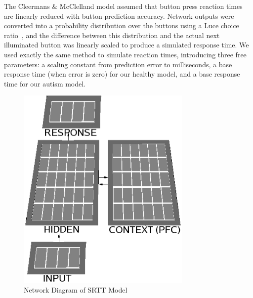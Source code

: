 The Cleermans \& McClelland model assumed that button press reaction times are linearly reduced with button prediction accuracy. Network outputs were converted into a probability distribution over the buttons using a Luce choice ratio~\cite{LuceRD:1963:Ratio}, and the difference between this distribution and the actual next illuminated button was linearly scaled to produce a simulated response time. We used exactly the same method to simulate reaction times, introducing three free parameters: a scaling constant from prediction error to milliseconds, a base response time (when error is zero) for our healthy model, and a base response time for our autism model.


\begin{figure}[t]
\begin{center}
	\includegraphics[width=85mm]{figures/srtt_network.eps}
\end{center}
\caption{Network Diagram of SRTT Model} 
\label{network-diagram-srtt}
\end{figure}

